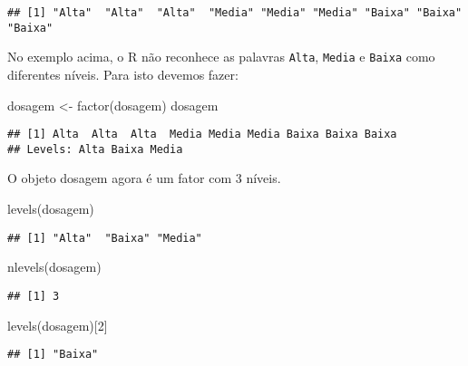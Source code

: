 \documentclass[
]{book}
\newenvironment{Shaded}{\begin{snugshade}}{\end{snugshade}}
\newcommand{\DecValTok}[1]{\textcolor[rgb]{0.00,0.00,0.81}{#1}}
\newcommand{\FunctionTok}[1]{\textcolor[rgb]{0.00,0.00,0.00}{#1}}
\newcommand{\NormalTok}[1]{#1}
\newcommand{\OtherTok}[1]{\textcolor[rgb]{0.56,0.35,0.01}{#1}}
\begin{document}
\begin{verbatim}
## [1] "Alta"  "Alta"  "Alta"  "Media" "Media" "Media" "Baixa" "Baixa" "Baixa"
\end{verbatim}

No exemplo acima, o R não reconhece as palavras \texttt{Alta}, \texttt{Media} e \texttt{Baixa} como diferentes níveis. Para isto devemos fazer:

\begin{Shaded}
\begin{Highlighting}[]
\NormalTok{dosagem }\OtherTok{\textless{}{-}} \FunctionTok{factor}\NormalTok{(dosagem)}
\NormalTok{dosagem}
\end{Highlighting}
\end{Shaded}

\begin{verbatim}
## [1] Alta  Alta  Alta  Media Media Media Baixa Baixa Baixa
## Levels: Alta Baixa Media
\end{verbatim}

O objeto dosagem agora é um fator com 3 níveis.

\begin{Shaded}
\begin{Highlighting}[]
\FunctionTok{levels}\NormalTok{(dosagem)}
\end{Highlighting}
\end{Shaded}

\begin{verbatim}
## [1] "Alta"  "Baixa" "Media"
\end{verbatim}

\begin{Shaded}
\begin{Highlighting}[]
\FunctionTok{nlevels}\NormalTok{(dosagem)}
\end{Highlighting}
\end{Shaded}

\begin{verbatim}
## [1] 3
\end{verbatim}

\begin{Shaded}
\begin{Highlighting}[]
\FunctionTok{levels}\NormalTok{(dosagem)[}\DecValTok{2}\NormalTok{]}
\end{Highlighting}
\end{Shaded}

\begin{verbatim}
## [1] "Baixa"
\end{verbatim}
\end{document}
